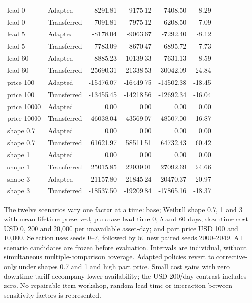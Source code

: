 \begin{small}
\begin{longtable}{llrrrr}
lead 0 & Adapted & -8291.81 & -9175.12 & -7408.50 & -8.29 \\

lead 0 & Transferred & -7091.81 & -7975.12 & -6208.50 & -7.09 \\

lead 5 & Adapted & -8178.04 & -9063.67 & -7292.40 & -8.12 \\

lead 5 & Transferred & -7783.09 & -8670.47 & -6895.72 & -7.73 \\

lead 60 & Adapted & -8885.23 & -10139.33 & -7631.13 & -8.59 \\

lead 60 & Transferred & 25690.31 & 21338.53 & 30042.09 & 24.84 \\

price 100 & Adapted & -15476.07 & -16449.75 & -14502.38 & -18.45 \\

price 100 & Transferred & -13455.45 & -14218.56 & -12692.34 & -16.04 \\

price 10000 & Adapted & 0.00 & 0.00 & 0.00 & 0.00 \\

price 10000 & Transferred & 46038.04 & 43569.07 & 48507.00 & 16.87 \\

shape 0.7 & Adapted & 0.00 & 0.00 & 0.00 & 0.00 \\

shape 0.7 & Transferred & 61621.97 & 58511.51 & 64732.43 & 60.42 \\

shape 1 & Adapted & 0.00 & 0.00 & 0.00 & 0.00 \\

shape 1 & Transferred & 25015.85 & 22939.01 & 27092.69 & 24.66 \\

shape 3 & Adapted & -21157.80 & -21845.24 & -20470.37 & -20.97 \\

shape 3 & Transferred & -18537.50 & -19209.84 & -17865.16 & -18.37 \\

\bottomrule

\end{longtable}

\end{small}

The twelve scenarios vary one factor at a time: base; Weibull shape 0.7, 1 and 3 with mean lifetime preserved; purchase lead time 0, 5 and 60 days; downtime cost USD 0, 200 and 20,000 per unavailable asset-day; and part price USD 100 and 10,000. Selection uses seeds 0--7, followed by 50 new paired seeds 2000--2049. All scenario candidates are frozen before evaluation. Intervals are individual, without simultaneous multiple-comparison coverage. Adapted policies revert to corrective-only under shapes 0.7 and 1 and high part price. Small cost gains with zero downtime tariff accompany lower availability; the USD 200/day contrast includes zero. No repairable-item workshop, random lead time or interaction between sensitivity factors is represented.

